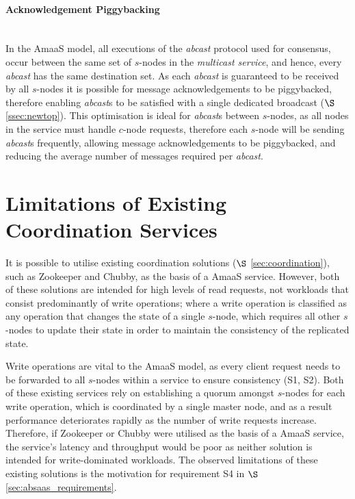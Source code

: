 		\paragraph{Acknowledgement Piggybacking} \hspace{0pt} \\
		In the \textsf{AmaaS} model, all executions of the \emph{abcast} protocol used for consensus, occur between the same set of $s$-nodes in the \emph{multicast service}, and hence, every \emph{abcast} has the same destination set.  As each \emph{abcast} is guaranteed to be received by all $s$-nodes it is possible for message acknowledgements to be piggybacked, therefore enabling \emph{abcast}s to be satisfied with a single dedicated broadcast ($\S$ \ref{ssec:newtop}).  This optimisation is ideal for \emph{abcast}s between $s$-nodes, as all nodes in the service must handle $c$-node requests, therefore each $s$-node will be sending \emph{abcast}s frequently, allowing message acknowledgements to be piggybacked, and reducing the average number of messages required per \emph{abcast}.  	
	
\section{Limitations of Existing Coordination Services}\label{sec:limitations_existing_coordination}
It is possible to utilise existing coordination solutions ($\S$ \ref{sec:coordination}), such as Zookeeper\citep{Hunt:2010:ZWC:1855840.1855851} and Chubby\citep{Burrows:2006:CLS:1298455.1298487}, as the basis of a \textsf{AmaaS} service.  However, both of these solutions are intended for high levels of read requests, not workloads that consist predominantly of write operations; where a write operation is classified as any operation that changes the state of a single $s$-node, which requires all other $s$-nodes to update their state in order to maintain the consistency of the replicated state.  

Write operations are vital to the \textsf{AmaaS} model, as every client request needs to be forwarded to all $s$-nodes within a service to ensure consistency (S1, S2).  Both of these existing services rely on establishing a quorum amongst $s$-nodes for each write operation, which is coordinated by a single master node, and as a result performance deteriorates rapidly as the number of write requests increase.  Therefore, if Zookeeper or Chubby were utilised as the basis of a \textsf{AmaaS} service, the service's latency and throughput would be poor as neither solution is intended for write-dominated workloads.  The observed limitations of these existing solutions is the motivation for requirement S4 in $\S$ \ref{sec:absaas_requirements}.  	
	
